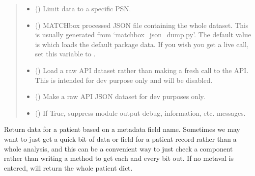 \documentclass[letterpaper,10pt,english]{sphinxmanual}
\begin{document}
\begin{fulllineitems}
\begin{quote}
\begin{description}
\begin{itemize}
\begin{quote}
\end{quote}


\item {} 
 () \textendash{} Limit data to a specific PSN.

\item {} 
 () \textendash{} MATCHbox processed JSON file containing the whole
dataset. This is usually generated from ‘matchbox\_json\_dump.py’.
The default value is  which loads the default
package data. If you wish you get a live call, set this variable
to .

\item {} 
 () \textendash{} Load a raw API dataset rather than making a fresh
call to the API. This is intended for dev purpose
only and will be disabled.

\item {} 
 () \textendash{} Make a raw API JSON dataset for dev purposes only.

\item {} 
 () \textendash{} If True, suppress module output debug, information, etc.
messages.

\end{itemize}

\end{description}\end{quote}

\begin{fulllineitems}
\label{\detokenize{matchbox_api_utils:matchbox_api_utils.match_data.MatchData.get_patient_meta}}
Return data for a patient based on a metadata field name. Sometimes we
may want to just get a quick bit of data or field for a patient record
rather than a whole analysis, and this can be a convenient way to just
check a component rather than writing a method to get each and every bit
out. If no metaval is entered, will return the whole patient dict.


\end{fulllineitems}
\end{fulllineitems}
\end{document}

